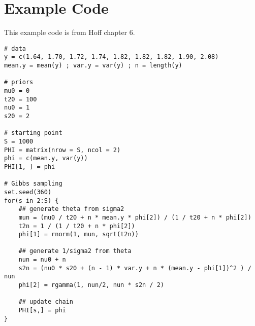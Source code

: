 \documentclass[titlepage, 12pt, leqno]{article}
\begin{document}
\section{Example Code}
This example code is from Hoff chapter 6.
\begin{verbatim}
# data
y = c(1.64, 1.70, 1.72, 1.74, 1.82, 1.82, 1.82, 1.90, 2.08)
mean.y = mean(y) ; var.y = var(y) ; n = length(y)

# priors
mu0 = 0
t20 = 100
nu0 = 1
s20 = 2

# starting point
S = 1000
PHI = matrix(nrow = S, ncol = 2)
phi = c(mean.y, var(y))
PHI[1, ] = phi

# Gibbs sampling
set.seed(360)
for(s in 2:S) { 
    ## generate theta from sigma2
    mun = (mu0 / t20 + n * mean.y * phi[2]) / (1 / t20 + n * phi[2])
    t2n = 1 / (1 / t20 + n * phi[2])
    phi[1] = rnorm(1, mun, sqrt(t2n))

    ## generate 1/sigma2 from theta
    nun = nu0 + n
    s2n = (nu0 * s20 + (n - 1) * var.y + n * (mean.y - phi[1])^2 ) / nun
    phi[2] = rgamma(1, nun/2, nun * s2n / 2)

    ## update chain
    PHI[s,] = phi
}
\end{verbatim}
\end{document}
